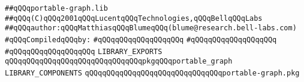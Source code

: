 \label{src/app/makelib/portable-graph/portable-graph.lib}
\verb|##qQQqportable-graph.lib|\newline
\verb|##qQQq(C)qQQq2001qQQqLucentqQQqTechnologies,qQQqBellqQQqLabs|\newline
\verb|##qQQqauthor:qQQqMatthiasqQQqBlumeqQQq(blume@research.bell-labs.com)|\newline
\newline
\verb|#qQQqCompiledqQQqby:|\newline
\verb|#qQQqqQQqqQQqqQQqqQQq|\newline
\verb|#qQQqqQQqqQQqqQQqqQQq|\newline
\verb|#qQQqqQQqqQQqqQQqqQQq|\newline
\newline
\verb|LIBRARY_EXPORTS|\newline
\newline
\verb|qQQqqQQqqQQqqQQqqQQqqQQqqQQqqQQqpkgqQQqportable_graph|\newline
\newline
\newline
\newline
\verb|LIBRARY_COMPONENTS|\newline
\newline
\verb|qQQqqQQqqQQqqQQqqQQqqQQqqQQqqQQqportable-graph.pkg|\newline

